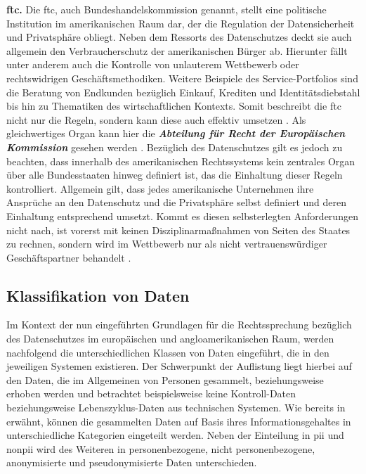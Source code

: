 
\noindent \textbf{\acl{ftc}.}
Die \acl{ftc}, auch Bundeshandelskommission genannt, stellt eine politische Institution im amerikanischen Raum dar, der die Regulation der Datensicherheit und Privatsphäre obliegt. Neben dem Ressorts des Datenschutzes deckt sie auch allgemein den Verbraucherschutz der amerikanischen Bürger ab. Hierunter fällt unter anderem auch die Kontrolle von unlauterem Wettbewerb oder rechtswidrigen Geschäftsmethodiken. Weitere Beispiele des Service-Portfolios sind die Beratung von Endkunden bezüglich Einkauf, Krediten und Identitätsdiebstahl bis hin zu Thematiken des wirtschaftlichen Kontexts. Somit beschreibt die \ac{ftc} nicht nur die Regeln, sondern kann diese auch effektiv umsetzen \cite{FTC}. Als gleichwertiges Organ kann hier die \textbf{\textit{Abteilung für Recht der Europäischen Kommission}} gesehen werden \cite{FTCEU}. Bezüglich des Datenschutzes gilt es jedoch zu beachten, dass innerhalb des amerikanischen Rechtssystems kein zentrales Organ über alle Bundesstaaten hinweg definiert ist, das die Einhaltung dieser Regeln kontrolliert. Allgemein gilt, dass jedes amerikanische Unternehmen ihre Ansprüche an den Datenschutz und die Privatsphäre selbst definiert und deren Einhaltung entsprechend umsetzt. Kommt es diesen selbsterlegten Anforderungen nicht nach, ist vorerst mit keinen Disziplinarmaßnahmen von Seiten des Staates zu rechnen, sondern wird im Wettbewerb nur als nicht vertrauenswürdiger Geschäftspartner behandelt \cite{DatenschutzOrg2022}.

\subsection{Klassifikation von Daten}
\label{sec:Grundlagen:ssec:Klassifikation von Daten}

Im Kontext der nun eingeführten Grundlagen für die Rechtssprechung bezüglich des Datenschutzes im europäischen und angloamerikanischen Raum, werden nachfolgend die unterschiedlichen Klassen von Daten eingeführt, die in den jeweiligen Systemen existieren. Der Schwerpunkt der Auflistung liegt hierbei auf den Daten, die im Allgemeinen von Personen gesammelt, beziehungsweise erhoben werden und betrachtet beispielsweise keine Kontroll-Daten beziehungsweise Lebenszyklus-Daten aus technischen Systemen. Wie bereits in  erwähnt, können die gesammelten Daten auf Basis ihres Informationsgehaltes in unterschiedliche Kategorien eingeteilt werden. Neben der Einteilung in \ac{pii} und \ac{nonpii} wird des Weiteren in personenbezogene, nicht personenbezogene, anonymisierte und pseudonymisierte Daten unterschieden.

